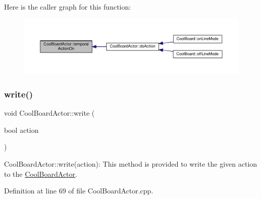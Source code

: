 Here is the caller graph for this function\+:
\nopagebreak
\begin{figure}[H]
\begin{center}
\leavevmode
\includegraphics[width=350pt]{dc/d69/class_cool_board_actor_ada603785c203fdb0b41cc967d70bdc4d_icgraph}
\end{center}
\end{figure}
\mbox{\label{class_cool_board_actor_a958786ff01ea1056ee72c72d439f86da}} 
\subsubsection{\texorpdfstring{write()}{write()}}
{\footnotesize\ttfamily void Cool\+Board\+Actor\+::write (\begin{DoxyParamCaption}\item[{bool}]{action }\end{DoxyParamCaption})}

Cool\+Board\+Actor\+::write(action)\+: This method is provided to write the given action to the \hyperlink{class_cool_board_actor}{Cool\+Board\+Actor}. 

Definition at line 69 of file Cool\+Board\+Actor.\+cpp.


